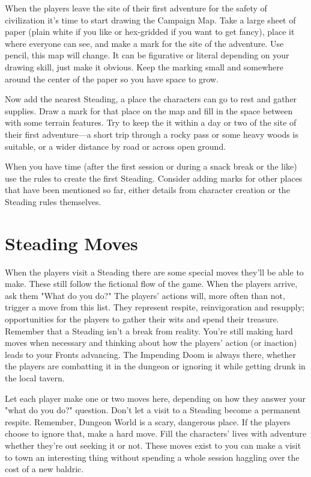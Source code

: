  

When the players leave the site of their first adventure for the safety of civilization it's time to start drawing the Campaign Map. Take a large sheet of paper (plain white if you like or hex-gridded if you want to get fancy), place it where everyone can see, and make a mark for the site of the adventure. Use pencil, this map will change. It can be figurative or literal depending on your drawing skill, just make it obvious. Keep the marking small and somewhere around the center of the paper so you have space to grow.

 

Now add the nearest Steading, a place the characters can go to rest and gather supplies. Draw a mark for that place on the map and fill in the space between with some terrain features. Try to keep the it within a day or two of the site of their first adventure—a short trip through a rocky pass or some heavy woods is suitable, or a wider distance by road or across open ground.

 

When you have time (after the first session or during a snack break or the like) use the rules to create the first Steading. Consider adding marks for other places that have been mentioned so far, either details from character creation or the Steading rules themselves.

 
\section{Steading Moves}   
 

When the players visit a Steading there are some special moves they'll be able to make. These still follow the fictional flow of the game. When the players arrive, ask them "What do you do?" The players' actions will, more often than not, trigger a move from this list. They represent respite, reinvigoration and resupply; opportunities for the players to gather their wits and spend their treasure. Remember that a Steading isn't a break from reality. You're still making hard moves when necessary and thinking about how the players' action (or inaction) leads to your Fronts advancing. The Impending Doom is always there, whether the players are combatting it in the dungeon or ignoring it while getting drunk in the local tavern.

 

Let each player make one or two moves here, depending on how they answer your "what do you do?" question. Don't let a visit to a Steading become a permanent respite. Remember, Dungeon World is a scary, dangerous place. If the players choose to ignore that, make a hard move. Fill the characters' lives with adventure whether they're out seeking it or not. These moves exist to you can make a visit to town an interesting thing without spending a whole session haggling over the cost of a new baldric.

